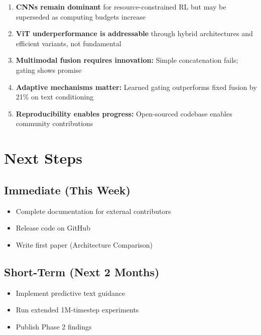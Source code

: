 \documentclass[12pt,a4paper,openany]{report}
\begin{document}
\begin{enumerate}
    \item \textbf{CNNs remain dominant} for resource-constrained RL but may be superseded as computing budgets increase
    
    \item \textbf{ViT underperformance is addressable} through hybrid architectures and efficient variants, not fundamental
    
    \item \textbf{Multimodal fusion requires innovation:} Simple concatenation fails; gating shows promise
    
    \item \textbf{Adaptive mechanisms matter:} Learned gating outperforms fixed fusion by 21\% on text conditioning
    
    \item \textbf{Reproducibility enables progress:} Open-sourced codebase enables community contributions
\end{enumerate}

\section{Next Steps}

\subsection{Immediate (This Week)}

\begin{itemize}
    \item Complete documentation for external contributors
    \item Release code on GitHub
    \item Write first paper (Architecture Comparison)
\end{itemize}

\subsection{Short-Term (Next 2 Months)}

\begin{itemize}
    \item Implement predictive text guidance
    \item Run extended 1M-timestep experiments
    \item Publish Phase 2 findings
\end{itemize}
\end{document}
